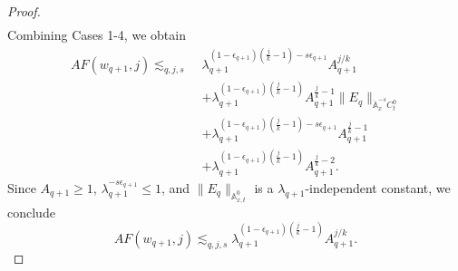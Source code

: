 \documentclass[10pt,a4paper]{amsart}
\begin{document}
\begin{proof}
\[\begin{aligned}
\end{aligned}
\] 
Combining Cases 1-4, we obtain
\[
\begin{aligned}
AF(w_{q+1},j)
\lesssim_{q,j,s}\;&
\lambda_{q+1}^{(1-\epsilon_{q+1})(\frac jk-1)-s\epsilon_{q+1}}
A_{q+1}^{j/k}
\\
&+
\lambda_{q+1}^{(1-\epsilon_{q+1})(\frac jk-1)}
A_{q+1}^{\frac jk-1}
\|E_q\|_{\dot{\mathbb A}^{-s}_xC_t^0}
\\
&+
\lambda_{q+1}^{(1-\epsilon_{q+1})(\frac jk-1)-s\epsilon_{q+1}}
A_{q+1}^{\frac jk-1}
\\
&+
\lambda_{q+1}^{(1-\epsilon_{q+1})(\frac jk-1)}
A_{q+1}^{\frac jk-2}.
\end{aligned}
\]
Since $A_{q+1}\geq1$, $\lambda_{q+1}^{-s\epsilon_{q+1}}\leq1$, and
$\|E_q\|_{\mathbb{A}_{x,t}^{0}}$ is a $\lambda_{q+1}$-independent constant, we conclude
\[
AF(w_{q+1},j)
\lesssim_{q,j,s}
\lambda_{q+1}^{(1-\epsilon_{q+1})(\frac jk-1)}
A_{q+1}^{j/k}.
\]
\end{proof}
\end{document}
